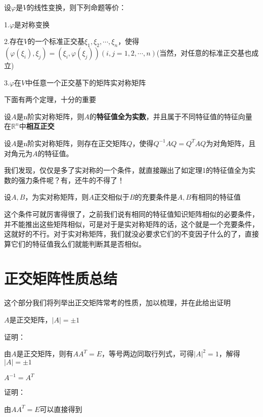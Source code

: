 \documentclass[lang=cn,10pt]{elegantbook}
\begin{document}
	\begin{conclusion}
		设$\varphi $是$V$的线性变换，则下列命题等价：
		
		1.$\varphi $是对称变换
		
		2.存在$V$的一个标准正交基$
		\xi _1,\xi _2,\cdots ,\xi _n
		$，使得$\left( \varphi \left( \xi_i \right) ,\xi_{j} \right) =\left( \xi_{i} ,\varphi \left( \xi_{j} \right) \right)(i,j=1,2,\cdots,n)$(当然，对任意的标准正交基也成立)
		
		3.$\varphi $在$V$中任意一个正交基下的矩阵实对称矩阵
	\end{conclusion}
	下面有两个定理，十分的重要
	\begin{theorem}
		设$A$是n阶实对称矩阵，则$A$的\textbf{特征值全为实数}，并且属于不同特征值的特征向量在$\mathbb{R}^{n}$中\textbf{相互正交}
	\end{theorem}
	\begin{theorem}
		设$A$是n阶实对称矩阵，则存在正交矩阵$Q$，使得$Q^{-1}AQ=Q^{T}AQ$为对角矩阵，且对角元为$A$的特征值。
	\end{theorem}
	我们发现，仅仅是多了实对称的一个条件，就直接蹦出了如定理1的特征值全为实数的强力条件呢？有，还牛的不得了！
	\begin{conclusion}
		设$A,B$，为实对称矩阵，则$A$正交相似于$B$的充要条件是$A,B$有相同的特征值
	\end{conclusion}
	这个条件可就厉害得很了，之前我们说有相同的特征值知识矩阵相似的必要条件，并不能推出这些矩阵相似，可是对于是实对称矩阵的话，这个就是一个充要条件，这就好的不行。对于实对称矩阵，我们就没必要求它们的不变因子什么的了，直接算它们的特征值我么们就能判断其是否相似。
	
\section{正交矩阵性质总结}

这个部分我们将列举出正交矩阵常考的性质，加以梳理，并在此给出证明

\begin{conclusion}
	$A$是正交矩阵，$|A|=\pm1$
\end{conclusion}

证明：

由$A$是正交矩阵，则有$AA^{T}=E$，等号两边同取行列式，可得$|A|^{2}=1$，解得$|A|=\pm1$

\begin{conclusion}
	$A^{-1}=A^{T}$
\end{conclusion}

证明：

由$AA^{T}=E$可以直接得到
\end{document}
